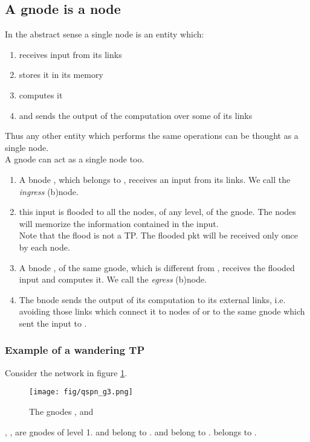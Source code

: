 \documentclass[a4paper]{article}
\begin{document}
\subsection{A gnode is a node}
In the abstract sense a single node is an entity which:
\begin{enumerate}
	\item receives input from its links
	\item stores it in its memory
	\item computes it
	\item and sends the output of the computation over some of its links
\end{enumerate}
Thus any other entity which performs the same operations can be thought as a
single node.\\
A gnode  can act as a single node too.
\begin{enumerate}
	\item A bnode , which belongs to , receives an input from its
		links. We call  the \emph{ingress} (b)node.
	\item this input is flooded to all the nodes, of any level, of the
		gnode. The nodes will memorize the information contained in
		the input.\\
		Note that the flood is not a TP. The flooded pkt will be
		received only once by each node.
	\item A bnode , of the same gnode, which is different from ,
		receives the flooded input and computes it.
		We call  the \emph{egress} (b)node.
	\item The bnode  sends the output of its computation to its
		external links, i.e. avoiding those links which connect it to
		nodes of  or to the same gnode which sent the input to .
\end{enumerate}

\subsubsection{Example of a wandering TP}
Consider the network in figure \ref{fig:qspn_g3}.\\
\begin{figure}[h]
	\begin{center}
		\texttt{[image: fig/qspn\_g3.png]}
	\end{center}
	\caption{The gnodes ,  and }
	\label{fig:qspn_g3}
\end{figure}
, ,  are gnodes of level 1.  and  belong to .  and  belong to
.  belongs to .\\
\end{document}
